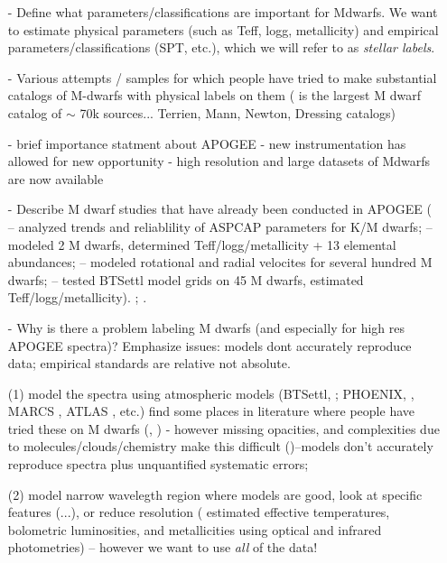 \documentclass[modern]{aastex62}
\begin{document}
\begin{enumerate}

\item[-] Define what parameters/classifications are important for Mdwarfs. We want to estimate physical parameters (such as Teff, logg, metallicity) and empirical parameters/classifications (SPT, etc.), which we will refer to as \emph{stellar labels}.

\item[-] Various attempts / samples for which people have tried to make substantial catalogs of M-dwarfs with physical labels on them (\citealt{West:2011} is the largest M dwarf catalog of $\sim$ 70k sources... Terrien, Mann, Newton, Dressing catalogs) 

\item[-] brief importance statment about APOGEE - new instrumentation has allowed for new opportunity - high resolution and large datasets of Mdwarfs are now available

\item[-] Describe M dwarf studies that have already been conducted in APOGEE (\citealt{Schmidt:2016} -- analyzed trends and reliablility of ASPCAP parameters for K/M dwarfs; \citealt{Souto:2017} -- modeled 2 M dwarfs, determined Teff/logg/metallicity + 13 elemental abundances; \citealt{Desphande:2013} -- modeled rotational and radial velocites for several hundred M dwarfs; \citealt{Rajpurohit:2018} -- tested BTSettl model grids on 45 M dwarfs, estimated Teff/logg/metallicity). \citealt{Gilhool:2018}; \citealt{Skinner:2018}.

\item[-] Why is there a problem labeling M dwarfs (and especially for high res APOGEE spectra)? Emphasize issues: models dont accurately reproduce data; empirical standards are relative not absolute. 

 (1) model the spectra using atmospheric models (BTSettl, \citealt{Allard:2011}; PHOENIX, \citealt{Husser:2013}, MARCS \citealt{Gustafsson:2008}, ATLAS \citealt{Castelli:2004}, etc.) find some places in literature where people have tried these on M dwarfs (\citealt{Rajpurohit:2014}, \citealt{Rajpurohit:2018}) - however missing opacities, and complexities due to molecules/clouds/chemistry make this difficult (\citealt{Allard:2013})--models don't accurately reproduce spectra plus unquantified systematic errors; 

 (2) model narrow wavelegth region where models are good, look at specific features (\citealt{Rojas-Ayala:2012}...), or reduce resolution (\citealt{Casagrande:2008} estimated effective temperatures, bolometric luminosities, and metallicities using optical and infrared photometries) -- however we want to use \emph{all} of the data!


\end{enumerate}
\end{document}
